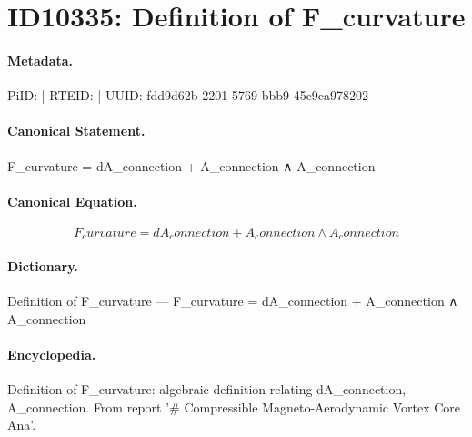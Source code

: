 \section*{ID10335: Definition of F\_curvature}
\paragraph{Metadata.}
PiID:  | RTEID:  | UUID: fdd9d62b-2201-5769-bbb9-45e9ca978202

\paragraph{Canonical Statement.}
F\_curvature = dA\_connection + A\_connection ∧ A\_connection

\paragraph{Canonical Equation.}
\[
F_curvature = dA_connection + A_connection ∧ A_connection
\]

\paragraph{Dictionary.}
Definition of F\_curvature — F\_curvature = dA\_connection + A\_connection ∧ A\_connection

\paragraph{Encyclopedia.}
Definition of F\_curvature: algebraic definition relating dA\_connection, A\_connection. From report '\# Compressible Magneto-Aerodynamic Vortex Core Ana'.

